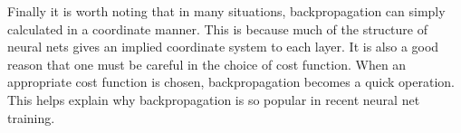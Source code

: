 Finally it is worth noting that in many situations, backpropagation can simply calculated in a coordinate manner.  This is because much of the structure of neural nets gives an implied coordinate system to each layer.  It is also a good reason that one must be careful in the choice of cost function. When an appropriate cost function is chosen, backpropagation becomes a quick operation. This helps explain why backpropagation is so popular in recent neural net training.